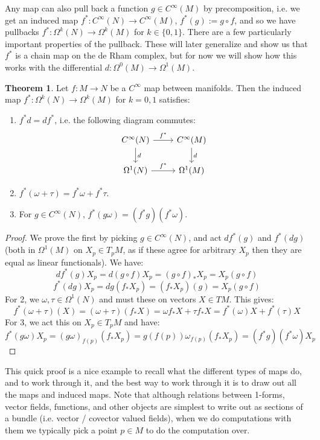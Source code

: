 \documentclass[11pt, oneside]{article}   	%
\theoremstyle{definition}
\newtheorem{theorem}{Theorem}[section]
\begin{document}
Any map can also pull back a function $g\in C^\infty(M)$ by precomposition, i.e. we get an induced map $f^* : C^\infty(N)
\rightarrow C^\infty(M)$, $f^*(g) := g\circ f$, and so we have pullbacks $f^* : \Omega^k(N)\rightarrow\Omega^k(M)$ for $k\in 
\{0, 1\}$. There are a few particularly important properties of the pullback. These will later generalize and show us that $f^*$ is 
a chain map on the de Rham complex, but for now we will show how this works with the differential $d : \Omega^0(M)
\rightarrow \Omega^1(M)$. 
\begin{theorem}
	Let $f : M\rightarrow N$ be a $C^\infty$ map between manifolds. Then the induced map $f^* : \Omega^k(N)\rightarrow 
	\Omega^k(M)$ for $k = 0, 1$ satisfies:
	\begin{enumerate}
		\item $f^* d = df^*$, i.e. the following diagram commutes:
		\begin{equation}\begin{tikzcd}
			C^\infty(N)\arrow[r, "f^*"]\arrow[d, "d"] & C^\infty(M) \arrow[d, "d"] \\
			\Omega^1(N)\arrow[r, "f^*"] & \Omega^1(M)
		\end{tikzcd}\end{equation}
		\item $f^*(\omega + \tau) = f^*\omega + f^*\tau$.
		\item For $g\in C^\infty(N)$, $f^*(g\omega) = (f^*g)(f^*\omega)$. 
	\end{enumerate}
\end{theorem}
\begin{proof}
	We prove the first by picking $g\in C^\infty(N)$, and act $df^*(g)$ and $f^*(dg)$ (both in $\Omega^1(M)$ on $X_p\in T_p 
	M$, as if these agree for arbitrary $X_p$ then they are equal as linear functionals). We have:
	\begin{equation}
		df^*(g) X_p = d(g\circ f) X_p = (g\circ f)_* X_p = X_p(g\circ f)
	\end{equation}
	\begin{equation}
		f^*(dg) X_p = dg(f_* X_p) = (f_*X_p)(g) = X_p(g\circ f)
	\end{equation}
	For 2, we $\omega, \tau\in\Omega^1(N)$ and must these on vectors $X\in TM$. This gives:
	\begin{equation}
		f^*(\omega + \tau)(X) = (\omega + \tau)(f_* X) = \omega f_* X + \tau f_* X = f^*(\omega)X + f^*(\tau) X
	\end{equation}
	For 3, we act this on $X_p\in T_p M$ and have:
	\begin{equation}
		f^*(g\omega) X_p = (g\omega)_{f(p)} (f_* X_p) = g(f(p)) \omega_{f(p)}(f_* X_p) = (f^* g)(f^*\omega) X_p
	\end{equation}
\end{proof}
This quick proof is a nice example to recall what the different types of maps do, and to work through it, and the best 
way to work through it is to draw out all the maps and induced maps. Note that although relations between 1-forms, vector 
fields, functions, and other objects are simplest to write out as sections of a bundle (i.e. vector / covector valued fields), when 
we do computations with them we typically pick a point $p\in M$ to do the computation over. 
\end{document}
